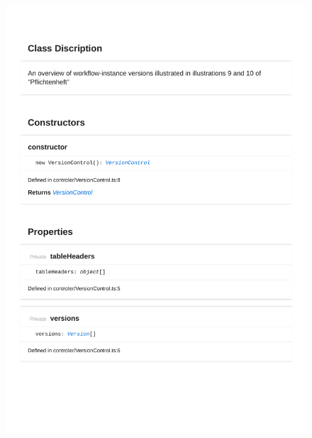 \begin{figure}[H]
\centerline{\includegraphics[width=1\textwidth]{FrontendDocsAsPDF/Model/VersionControl.pdf}}
\end{figure}

